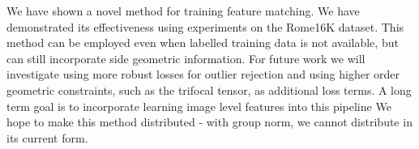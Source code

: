 \documentclass[10pt,twocolumn,letterpaper]{article}
\begin{document}
We have shown a novel method for training feature matching.
We have demonstrated its effectiveness using experiments on the Rome16K dataset.
This method can be employed even when labelled training data is not available, but can still incorporate side geometric information.
For future work we will investigate using more robust losses for outlier rejection and using higher order geometric constraints, such as the trifocal tensor, as additional loss terms.
A long term goal is to incorporate learning image level features into this pipeline
We hope to make this method distributed - with group norm, we cannot distribute in its current form.

{\small


}
\end{document}
